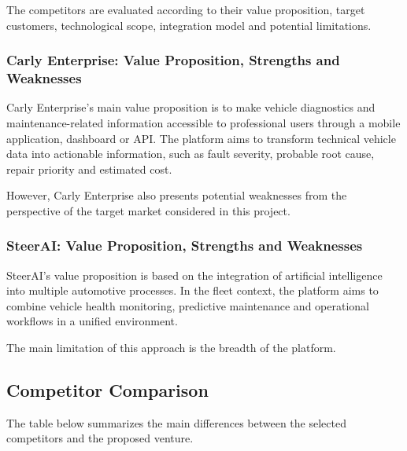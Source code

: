 \documentclass[11pt,a4paper]{article}
\begin{document}
The competitors are evaluated according to their value proposition, target
customers, technological scope, integration model and potential limitations.

\subsubsection{Carly Enterprise: Value Proposition, Strengths and Weaknesses}

Carly Enterprise's main value proposition is to make vehicle diagnostics and
maintenance-related information accessible to professional users through a
mobile application, dashboard or API. The platform aims to transform technical
vehicle data into actionable information, such as fault severity, probable root
cause, repair priority and estimated cost.

However, Carly Enterprise also presents potential weaknesses from the
perspective of the target market considered in this project.

\subsubsection{SteerAI: Value Proposition, Strengths and Weaknesses}

SteerAI's value proposition is based on the integration of artificial
intelligence into multiple automotive processes. In the fleet context, the
platform aims to combine vehicle health monitoring, predictive maintenance and
operational workflows in a unified environment.

The main limitation of this approach is the breadth of the platform.
\subsection{Competitor Comparison}

The table below summarizes the main differences between the selected competitors and the proposed venture.
\end{document}
